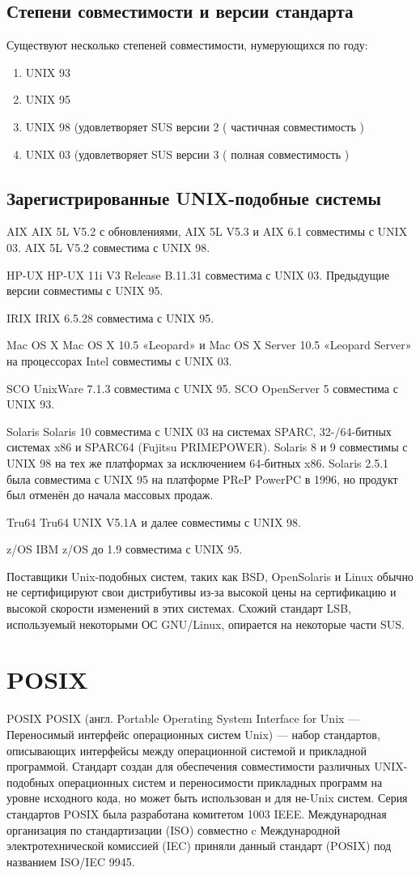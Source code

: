 \subsection {Степени совместимости и версии стандарта}
Существуют несколько степеней совместимости, нумерующихся по году:
\begin{enumerate}
\item UNIX 93
\item UNIX 95
\item UNIX 98 (удовлетворяет SUS версии 2 ( частичная совместимость )
\item UNIX 03 (удовлетворяет SUS версии 3 ( полная совместимость )
\end{enumerate}
\subsection{Зарегистрированные UNIX-подобные системы}

AIX
    AIX 5L V5.2 с обновлениями, AIX 5L V5.3 и AIX 6.1 совместимы с UNIX 03. AIX 5L V5.2 совместима с UNIX 98.

HP-UX
    HP-UX 11i V3 Release B.11.31 совместима с UNIX 03. Предыдущие версии совместимы с UNIX 95.

IRIX
    IRIX 6.5.28 совместима с UNIX 95.

Mac OS X
    Mac OS X 10.5 «Leopard» и Mac OS X Server 10.5 «Leopard Server» на процессорах Intel совместимы с UNIX 03.

SCO
    UnixWare 7.1.3 совместима с UNIX 95. SCO OpenServer 5 совместима с UNIX 93.

Solaris
    Solaris 10 совместима с UNIX 03 на системах SPARC, 32-/64-битных системах x86 и SPARC64 (Fujitsu PRIMEPOWER). Solaris 8 и 9 совместимы с UNIX 98 на тех же платформах за исключением 64-битных x86. Solaris 2.5.1 была совместима с UNIX 95 на платформе PReP PowerPC в 1996, но продукт был отменён до начала массовых продаж.

Tru64
    Tru64 UNIX V5.1A и далее совместимы с UNIX 98.

z/OS
    IBM z/OS до 1.9 совместима с UNIX 95.

Поставщики Unix-подобных систем, таких как BSD, OpenSolaris и Linux обычно не сертифицируют свои дистрибутивы из-за высокой цены на сертификацию и высокой скорости изменений в этих системах. Схожий стандарт LSB, используемый некоторыми ОС GNU/Linux, опирается на некоторые части SUS.
\section{POSIX}
POSIX
POSIX (англ. Portable Operating System Interface for Unix — Переносимый интерфейс операционных систем Unix) — набор стандартов, описывающих интерфейсы между операционной системой и прикладной программой. Стандарт создан для обеспечения совместимости различных UNIX-подобных операционных систем и переносимости прикладных программ на уровне исходного кода, но может быть использован и для не-Unix систем. Серия стандартов POSIX была разработана комитетом 1003 IEEE. Международная организация по стандартизации (ISO) совместно c Международной электротехнической комиссией (IEC) приняли данный стандарт (POSIX) под названием ISO/IEC 9945.

